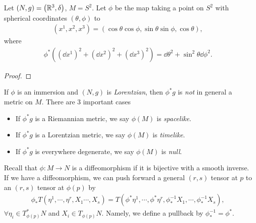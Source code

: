 
\begin{exercise}
    Let $\left( N,g \right) = \left( \mathbb{R}^3, \delta \right) $, $M = S^2$. Let $\phi$ be the map taking a point on $S^2 $ with spherical coordinates $\left( \theta, \phi \right) $ to 
    \begin{align}
        \left( x^{1}, x^{2}, x^{3} \right) = \left( \cos \theta \cos \phi, \sin \theta \sin \phi, \cos \theta \right) 
    ,\end{align}
    where
    \begin{align}
        \phi^{*}\left( \left( \dd{x}^{1} \right)^2 + \left( \dd{x}^{2} \right)^2 + \left( \dd{x}^{3} \right)^2 \right) = \dd{\theta}^2 + \sin^2\theta \dd{\phi}^2
    .\end{align}
\end{exercise}

\begin{proof}
    
\end{proof}

If $\phi$ is an immersion and $\left( N,g \right) $ is \textit{Lorentzian}, then $\phi^* g$ is \textit{not} in general a metric on $M$. There are 3 important cases
\begin{itemize}
    \item If $\phi^{*} g$ is a Riemannian metric, we say $\phi \left( M \right) $ is \textit{spacelike}.
    \item If $\phi^{*} g$ is a Lorentzian metric, we say $\phi \left( M \right) $ is \textit{timelike}.
    \item If $\phi^{*} g$ is everywhere degenerate, we say $\phi \left( M \right) $ is \textit{null}.
\end{itemize}

Recall that $\phi : M \to N$ is a diffeomorphism if it is bijective with a smooth inverse. If we have a diffeomorphism, we can push forward a general $\left( r,s \right) $ tensor at $p$ to an $\left( r,s \right) $ tensor at $\phi \left( p \right) $ by
\begin{align}
    \phi_{*} T \left( \eta^{1}, \cdots, \eta^{r}, X_1 \cdots , X_s \right) = T \left( \phi^{*} \eta^{1}, \cdots, \phi^{*} \eta^{r}, \phi_*^{-1} X_1,\cdots, \phi_*^{-1} X_s \right) 
,\end{align}
$\forall  \eta_i \in T_{\phi \left( p \right) }^{*} N$ and $X_i \in T_{\phi \left( p \right) } N$. Namely, we define a pullback by $\phi_*^{-1} = \phi^{*}$.

